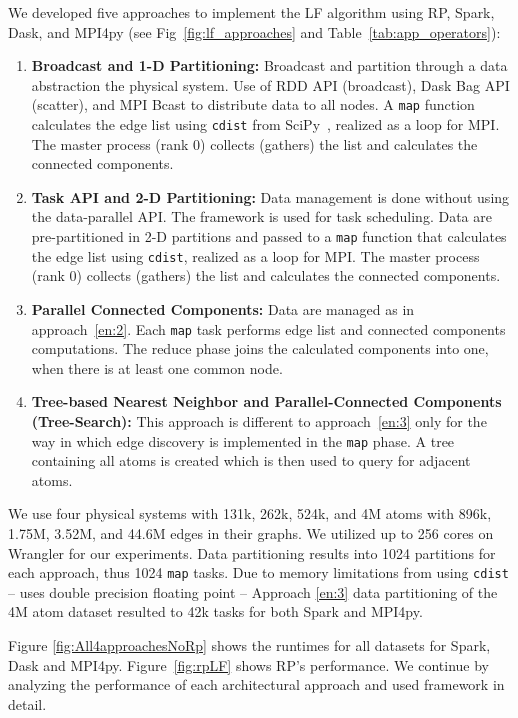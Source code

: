 We developed five approaches to implement the LF algorithm using RP,
Spark, Dask, and MPI4py (see Fig~\ref{fig:lf_approaches} and
Table~\ref{tab:app_operators}):
\begin{enumerate}[1)]
    \item \textbf{Broadcast and 1-D Partitioning:} Broadcast and partition
    through a data abstraction the physical system. Use of RDD API
    (broadcast), Dask Bag API (scatter), and MPI Bcast to distribute data to all
    nodes. A \texttt{map} function calculates the edge list using \texttt{cdist}
    from SciPy~\cite{scipy}, realized as a loop for MPI. The master process (rank 0)
    collects (gathers) the list and calculates the connected components.\label{en:1}
    \item \textbf{Task API and 2-D Partitioning:} Data management is done
    without using the data-parallel API. The framework is used for task
    scheduling. Data are pre-partitioned in 2-D partitions and passed to a
    \texttt{map} function that calculates the edge list using \texttt{cdist},
    realized as a loop for MPI.  The master process (rank 0)
    collects (gathers) the list and calculates the connected components.\label{en:2}
    \item \textbf{Parallel Connected Components:} Data are managed as in
    approach~\ref{en:2}. Each \texttt{map} task performs edge list and connected
    components computations. The reduce phase joins the calculated components
    into one, when there is at least one common node.\label{en:3}
    \item \textbf{Tree-based Nearest Neighbor and Parallel-Connected Components
    (Tree-Search):} This approach is different to approach~\ref{en:3} only for
    the way in which edge discovery is implemented in the \texttt{map} phase. A
    tree containing all atoms is created which is then used to query for
    adjacent atoms.\label{en:4}
\end{enumerate}

We use four physical systems with 131k, 262k, 524k, and 4M atoms with
896k, 1.75M, 3.52M, and 44.6M edges in their graphs. We utilized up to
256 cores on Wrangler for our experiments. Data partitioning results into 1024
partitions for each approach, thus 1024 \texttt{map} tasks. Due to memory
limitations from using \texttt{cdist} -- uses double precision floating point --
Approach \ref{en:3} data partitioning of the 4M atom dataset resulted to 42k
tasks for both Spark and MPI4py.

Figure \ref{fig:All4approachesNoRp} shows the runtimes for all datasets for
Spark, Dask and MPI4py. Figure~\ref{fig:rpLF} shows RP's performance.
 We continue by analyzing the performance of each
architectural approach and used framework in detail.

